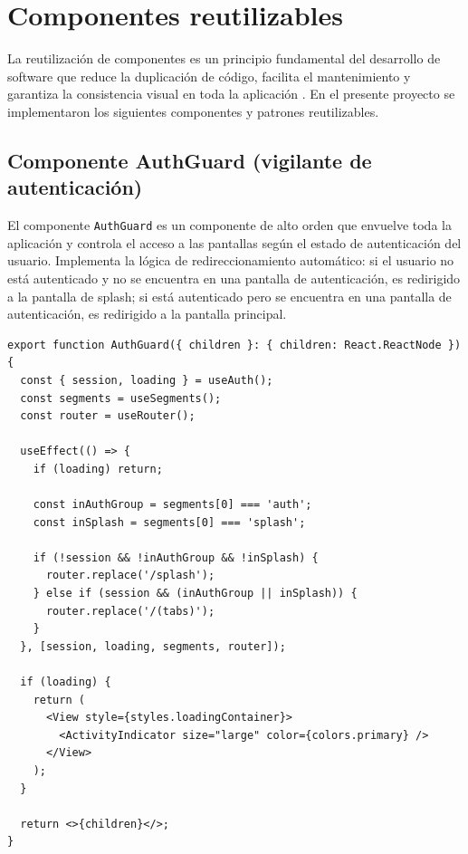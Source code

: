 
\section{Componentes reutilizables}

La reutilizaci\'on de componentes es un principio fundamental del desarrollo
de software que reduce la duplicaci\'on de c\'odigo, facilita el mantenimiento
y garantiza la consistencia visual en toda la aplicaci\'on
\citep{sommerville2011}. En el presente proyecto se implementaron los
siguientes componentes y patrones reutilizables.

\subsection{Componente AuthGuard (vigilante de autenticaci\'on)}

El componente \texttt{AuthGuard} es un componente de alto orden que envuelve
toda la aplicaci\'on y controla el acceso a las pantallas seg\'un el estado de
autenticaci\'on del usuario. Implementa la l\'ogica de redireccionamiento
autom\'atico: si el usuario no est\'a autenticado y no se encuentra en una
pantalla de autenticaci\'on, es redirigido a la pantalla de splash; si est\'a
autenticado pero se encuentra en una pantalla de autenticaci\'on, es redirigido
a la pantalla principal.

\begin{lstlisting}
export function AuthGuard({ children }: { children: React.ReactNode }) {
  const { session, loading } = useAuth();
  const segments = useSegments();
  const router = useRouter();

  useEffect(() => {
    if (loading) return;

    const inAuthGroup = segments[0] === 'auth';
    const inSplash = segments[0] === 'splash';

    if (!session && !inAuthGroup && !inSplash) {
      router.replace('/splash');
    } else if (session && (inAuthGroup || inSplash)) {
      router.replace('/(tabs)');
    }
  }, [session, loading, segments, router]);

  if (loading) {
    return (
      <View style={styles.loadingContainer}>
        <ActivityIndicator size="large" color={colors.primary} />
      </View>
    );
  }

  return <>{children}</>;
}
\end{lstlisting}

